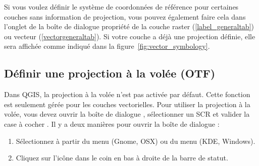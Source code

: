 Si vous voulez définir le système de coordonnées de référence pour certaines
couches sans information de projection, vous pouvez également faire cela
dans l'onglet  de la boîte de dialogue propriété de la couche
raster (\ref{label_generaltab}) ou vecteur (\ref{vectorgeneraltab}). 
Si votre couche a déjà une projection définie, elle
sera affichée comme indiqué dans la figure~\ref{fig:vector_symbology}.

\subsection{Définir une projection à la volée (OTF)}\label{label_projstart}

Dans QGIS, la projection à la volée n'est pas activée par défaut. Cette fonction est
seulement gérée pour les couches vectorielles. Pour utiliser la projection à la
volée, vous devez ouvrir la boîte de dialogue
, sélectionner un 
SCR et valider la case à cocher . Il y a deux manières pour ouvrir la boîte de dialogue :

\begin{enumerate}
\item Sélectionnez  à partir du 
menu  (Gnome, OSX) ou du menu  (KDE, Windows).

\item Cliquez sur l'icône  dans
le coin en bas à droite de la barre de statut.
\end{enumerate}

